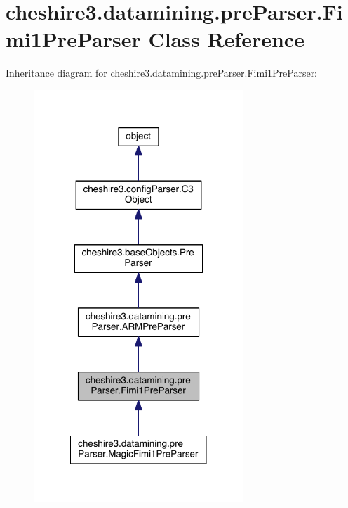 \hypertarget{classcheshire3_1_1datamining_1_1pre_parser_1_1_fimi1_pre_parser}{\section{cheshire3.\-datamining.\-pre\-Parser.\-Fimi1\-Pre\-Parser Class Reference}
\label{classcheshire3_1_1datamining_1_1pre_parser_1_1_fimi1_pre_parser}
}


Inheritance diagram for cheshire3.\-datamining.\-pre\-Parser.\-Fimi1\-Pre\-Parser\-:
\nopagebreak
\begin{figure}[H]
\begin{center}
\leavevmode
\includegraphics[width=224pt]{classcheshire3_1_1datamining_1_1pre_parser_1_1_fimi1_pre_parser__inherit__graph}
\end{center}
\end{figure}


